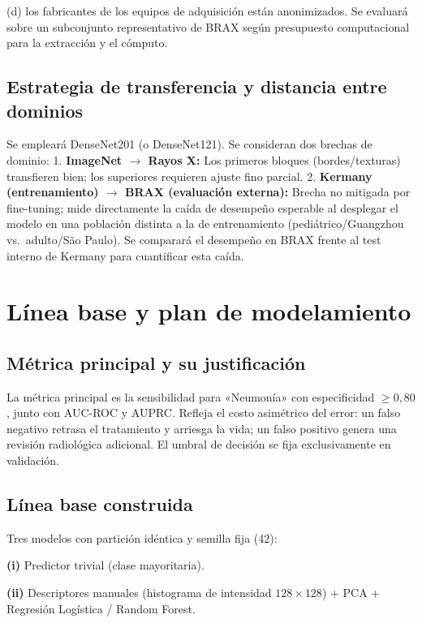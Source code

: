 \documentclass[11pt]{article}
\begin{document}
(d) los fabricantes de los equipos de adquisición están anonimizados. Se evaluará sobre un subconjunto representativo de BRAX según presupuesto computacional para la extracción y el cómputo.

\subsection{Estrategia de transferencia y distancia entre dominios}

Se empleará DenseNet201 (o DenseNet121). Se consideran dos brechas de dominio:
1. \textbf{ImageNet $\rightarrow$ Rayos X:} Los primeros bloques (bordes/texturas) transfieren bien; los superiores requieren ajuste fino parcial.
2. \textbf{Kermany (entrenamiento) $\rightarrow$ BRAX (evaluación externa):} Brecha no mitigada por fine-tuning; mide directamente la caída de desempeño esperable al desplegar el modelo en una población distinta a la de entrenamiento (pediátrico/Guangzhou vs.\ adulto/São Paulo). Se comparará el desempeño en BRAX frente al test interno de Kermany para cuantificar esta caída.

\section{Línea base y plan de modelamiento}

\subsection{Métrica principal y su justificación}

La métrica principal es la sensibilidad para «Neumonía» con especificidad $\ge 0,80$, junto con AUC-ROC y AUPRC. Refleja el costo asimétrico del error: un falso negativo retrasa el tratamiento y arriesga la vida; un falso positivo genera una revisión radiológica adicional. El umbral de decisión se fija exclusivamente en validación.

\subsection{Línea base construida}

Tres modelos con partición idéntica y semilla fija (42):

\textbf{(i)} Predictor trivial (clase mayoritaria).

\textbf{(ii)} Descriptores manuales (histograma de intensidad $128\times128$) + PCA + Regresión Logística / Random Forest.
\end{document}
